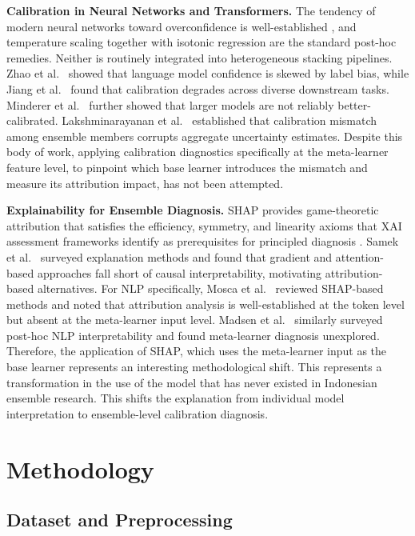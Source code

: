 \documentclass[conference]{IEEEtran}
\begin{document}
\textbf{Calibration in Neural Networks and Transformers.}
The tendency of modern neural networks toward overconfidence is well-established \cite{b15}, and temperature scaling together with isotonic regression are the standard post-hoc remedies. Neither is routinely integrated into heterogeneous stacking pipelines. Zhao et al.\ \cite{b16} showed that language model confidence is skewed by label bias, while Jiang et al.\ \cite{b13} found that calibration degrades across diverse downstream tasks. Minderer et al.\ \cite{b18} further showed that larger models are not reliably better-calibrated. Lakshminarayanan et al.\ \cite{b17} established that calibration mismatch among ensemble members corrupts aggregate uncertainty estimates. Despite this body of work, applying calibration diagnostics specifically at the meta-learner feature level, to pinpoint which base learner introduces the mismatch and measure its attribution impact, has not been attempted.

\textbf{Explainability for Ensemble Diagnosis.}
SHAP \cite{b11} provides game-theoretic attribution that satisfies the efficiency, symmetry, and linearity axioms that XAI assessment frameworks identify as prerequisites for principled diagnosis \cite{b27}. Samek et al.\ \cite{b12} surveyed explanation methods and found that gradient and attention-based approaches fall short of causal interpretability, motivating attribution-based alternatives. For NLP specifically, Mosca et al.\ \cite{b31} reviewed SHAP-based methods and noted that attribution analysis is well-established at the token level but absent at the meta-learner input level. Madsen et al.\ \cite{b20} similarly surveyed post-hoc NLP interpretability and found meta-learner diagnosis unexplored. Therefore, the application of SHAP, which uses the meta-learner input as the base learner represents an interesting methodological shift. This represents a transformation in the use of the model that has never existed in Indonesian ensemble research. This shifts the explanation from individual model interpretation to ensemble-level calibration diagnosis.

\section{Methodology}

\subsection{Dataset and Preprocessing}
\end{document}

